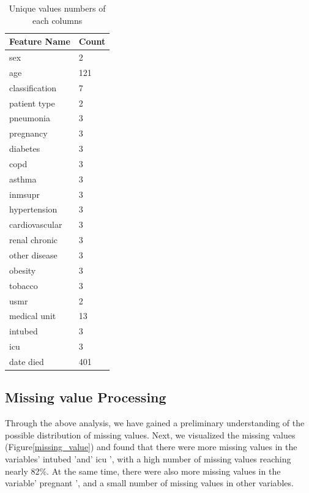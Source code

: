 \documentclass[
  journal=medium,
  manuscript=Report,
  year=2023,
  volume=37,
]{cup-journal}
\begin{document}
\begin{table}[hbt!]
    \begin{threeparttable}
    \caption{Unique values numbers of each columns}
    \label{attribute2}
    \begin{tabular}{ll}
        \toprule
        \headrow Feature Name & Count \\
        \midrule
        sex & 2 \\ 
        \midrule
        age & 121 \\ 
        \midrule
        classification & 7 \\ 
        \midrule
        patient type & 2 \\ 
        \midrule
        pneumonia & 3 \\ 
        \midrule
        pregnancy & 3 \\ 
        \midrule
        diabetes & 3 \\ 
        \midrule
        copd & 3 \\ 
        \midrule
        asthma & 3 \\ 
        \midrule
        inmsupr & 3 \\ 
        \midrule
        hypertension &  3 \\ 
        \midrule
        cardiovascular &  3 \\ 
        \midrule
        renal chronic &  3 \\ 
        \midrule
        other disease & 3 \\ 
        \midrule
        obesity &  3 \\ 
        \midrule
        tobacco &  3 \\ 
        \midrule
        usmr &  2 \\ 
        \midrule
        medical unit & 13 \\ 
        \midrule
        intubed &  3 \\ 
        \midrule
        icu &  3 \\ 
        \midrule
        date died &  401 \\ 
        \bottomrule 
    \end{tabular}
\end{threeparttable}
\end{table}


\subsection{Missing value Processing}

Through the above analysis, we have gained a preliminary understanding of the possible distribution of missing values. Next, we visualized the missing values (Figure\ref{missing_value}) and found that there were more missing values in the variables' intubed 'and' icu ', with a high number of missing values reaching nearly 82\%. At the same time, there were also more missing values in the variable' pregnant ', and a small number of missing values in other variables.
\end{document}
